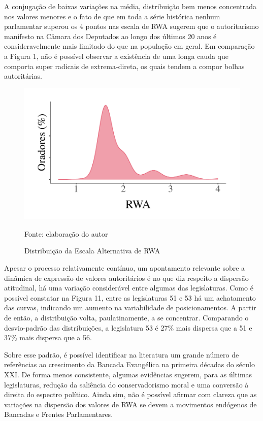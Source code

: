 \documentclass[
12pt,				%
openright,			%
twoside,			%
a4paper,			%
english,			%
french,				%
spanish,			%
brazil				%
]{abntex2}
\begin{document}
A conjugação de baixas variações na média, distribuição bem menos concentrada nos valores menores e o fato de que em toda a série histórica nenhum parlamentar superou os 4 pontos nas escala de RWA sugerem que o autoritarismo manifesto na Câmara dos Deputados ao longo dos últimos 20 anos é consideravelmente mais limitado do que na população em geral. Em comparação a Figura 1, não é possível observar a existência de uma longa cauda que comporta super radicais de extrema-direta, os quais tendem a compor bolhas autoritárias.


\begin{figure}[h]
	\caption{Distribuição da Escala Alternativa de RWA}
	\label{fig:scale_rwa}
	\centering
	\includegraphics[width=.6\linewidth]{figures/scale_rwa}
	
	Fonte: elaboração do autor	
\end{figure}

Apesar o processo relativamente contínuo, um apontamento relevante sobre a dinâmica de expressão de valores autoritários é no que diz respeito a dispersão atitudinal, há uma variação considerável entre algumas das legislaturas. Como é possível constatar na Figura 11, entre as legislaturas 51 e 53 há um achatamento das curvas, indicando um aumento na variabilidade de posicionamentos. A partir de então, a distribuição volta, paulatinamente, a se concentrar. Comparando o desvio-padrão das distribuições, a legislatura 53 é 27{\%} mais dispersa que a 51 e 37{\%} mais dispersa que a 56.

Sobre esse padrão, é possível identificar na literatura um grande número de referências ao crescimento da Bancada Evangélica na primeira décadas do século XXI. De forma menos consistente, algumas evidências sugerem, para as últimas legislaturas, redução da saliência do conservadorismo moral e uma conversão à direita do espectro político. Ainda sim, não é possível afirmar com clareza que as variações na dispersão dos valores de RWA se devem a movimentos endógenos de Bancadas e Frentes Parlamentares.     
\end{document}
